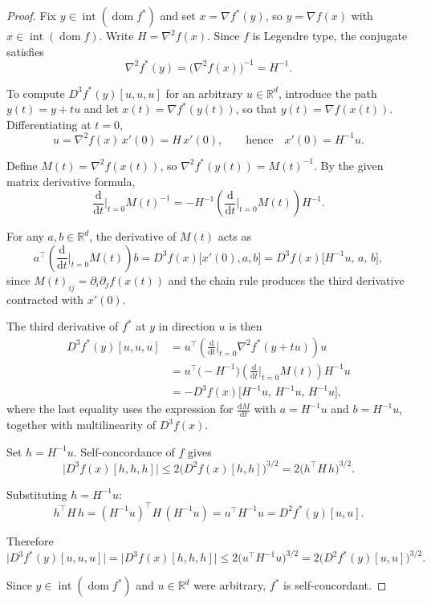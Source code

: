 \documentclass[12pt]{article}
\begin{document}
\begin{proof}
Fix $y \in \operatorname{int}(\operatorname{dom} f^*)$ and set $x = \nabla f^*(y)$, so $y = \nabla f(x)$ with $x \in \operatorname{int}(\operatorname{dom} f)$. Write $H = \nabla^2 f(x)$. Since $f$ is Legendre type, the conjugate satisfies
\[
\nabla^2 f^*(y) = \bigl(\nabla^2 f(x)\bigr)^{-1} = H^{-1}.
\]

To compute $D^3 f^*(y)[u,u,u]$ for an arbitrary $u \in \mathbb{R}^d$, introduce the path $y(t) = y + tu$ and let $x(t) = \nabla f^*(y(t))$, so that $y(t) = \nabla f(x(t))$. Differentiating at $t = 0$,
\[
u = \nabla^2 f(x) \, x'(0) = H \, x'(0), \qquad \text{hence} \quad x'(0) = H^{-1} u.
\]

Define $M(t) = \nabla^2 f(x(t))$, so $\nabla^2 f^*(y(t)) = M(t)^{-1}$. By the given matrix derivative formula,
\[
\frac{\mathrm{d}}{\mathrm{d}t}\Big|_{t=0} M(t)^{-1} = -H^{-1} \left(\frac{\mathrm{d}}{\mathrm{d}t}\Big|_{t=0} M(t)\right) H^{-1}.
\]

For any $a, b \in \mathbb{R}^d$, the derivative of $M(t)$ acts as
\[
a^\top \!\left(\frac{\mathrm{d}}{\mathrm{d}t}\Big|_{t=0} M(t)\right) b = D^3 f(x)\bigl[x'(0), a, b\bigr] = D^3 f(x)\bigl[H^{-1}u,\, a,\, b\bigr],
\]
since $M(t)_{ij} = \partial_i \partial_j f(x(t))$ and the chain rule produces the third derivative contracted with $x'(0)$.

The third derivative of $f^*$ at $y$ in direction $u$ is then
\begin{align*}
D^3 f^*(y)[u,u,u]
&= u^\top \!\left(\frac{\mathrm{d}}{\mathrm{d}t}\Big|_{t=0} \nabla^2 f^*(y+tu)\right) u \\
&= u^\top \bigl(-H^{-1}\bigr) \left(\frac{\mathrm{d}}{\mathrm{d}t}\Big|_{t=0} M(t)\right) H^{-1} u \\
&= -D^3 f(x)\bigl[H^{-1}u,\, H^{-1}u,\, H^{-1}u\bigr],
\end{align*}
where the last equality uses the expression for $\tfrac{\mathrm{d}M}{\mathrm{d}t}$ with $a = H^{-1}u$ and $b = H^{-1}u$, together with multilinearity of $D^3 f(x)$.

Set $h = H^{-1}u$. Self-concordance of $f$ gives
\[
\bigl|D^3 f(x)[h,h,h]\bigr| \leq 2\bigl(D^2 f(x)[h,h]\bigr)^{3/2} = 2\bigl(h^\top H\, h\bigr)^{3/2}.
\]

Substituting $h = H^{-1}u$:
\[
h^\top H\, h = (H^{-1}u)^\top H\, (H^{-1}u) = u^\top H^{-1} u = D^2 f^*(y)[u,u].
\]

Therefore
\[
\bigl|D^3 f^*(y)[u,u,u]\bigr| = \bigl|D^3 f(x)[h,h,h]\bigr| \leq 2\bigl(u^\top H^{-1} u\bigr)^{3/2} = 2\bigl(D^2 f^*(y)[u,u]\bigr)^{3/2}.
\]

Since $y \in \operatorname{int}(\operatorname{dom} f^*)$ and $u \in \mathbb{R}^d$ were arbitrary, $f^*$ is self-concordant.
\end{proof}
\end{document}
